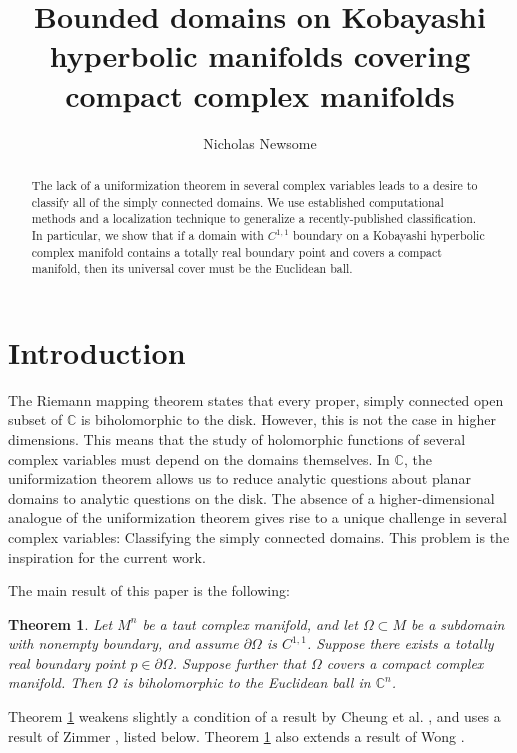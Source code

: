 \documentclass[12pt]{article}
\title{Bounded domains on Kobayashi hyperbolic manifolds covering compact complex manifolds}
\author{Nicholas Newsome}
\date{}
\newcommand{\C}{\mathbb{C}}
\newtheorem{theorem}[lemma]{Theorem}
\begin{document}
\maketitle

\begin{abstract}

The lack of a uniformization theorem in several complex variables leads to a desire to classify all of the simply connected domains. We use established computational methods and a localization technique to generalize a recently-published classification. In particular, we show that if a domain with $C^{1,1}$ boundary on a Kobayashi hyperbolic complex manifold contains a totally real boundary point and covers a compact manifold, then its universal cover must be the Euclidean ball. 
\end{abstract}


\section{Introduction}
\label{IntroSec}
The Riemann mapping theorem states that every proper, simply connected open subset of $\C$ is biholomorphic to the disk. However, this is not the case in higher dimensions. This means that the study of holomorphic functions of several complex variables must depend on the domains themselves. In $\C$, the uniformization theorem allows us to reduce analytic questions about planar domains to analytic questions on the disk. The absence of a higher-dimensional analogue of the uniformization theorem gives rise to a unique challenge in several complex variables: Classifying the simply connected domains. This problem is the inspiration for the current work.

The main result of this paper is the following:
\begin{theorem}
\label{dissthm}
Let $M^n$ be a taut complex manifold, and let $\Omega\subset M$ be a subdomain with nonempty boundary, and assume $\partial\Omega$ is $C^{1,1}$. Suppose there exists a totally real boundary point $p\in\partial\Omega$. Suppose further that $\Omega$ covers a compact complex manifold. Then $\Omega$ is biholomorphic to the Euclidean ball in $\C^n$.
\end{theorem}

Theorem \ref{dissthm} weakens slightly a condition of a result by Cheung et al. \cite{CFKW}, and uses a result of Zimmer \cite{Zimmer}, listed below. Theorem \ref{dissthm} also extends a result of Wong \cite{Wong77}.
\end{document}
